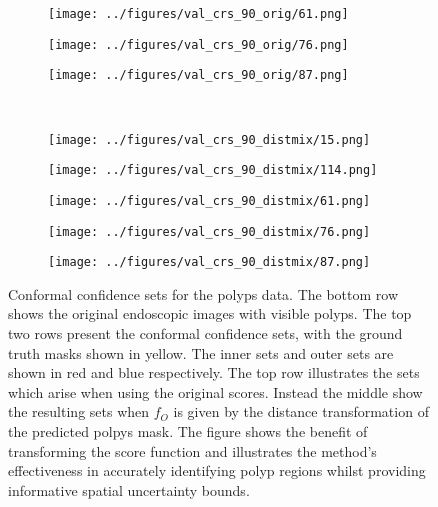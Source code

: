 \begin{figure}
\begin{subfigure}{0.19\textwidth}
		\centering
		\texttt{[image: ../figures/val\_crs\_90\_orig/61.png]}
		\label{fig:1}
	\end{subfigure}
	\begin{subfigure}{0.19\textwidth}
		\centering
		\texttt{[image: ../figures/val\_crs\_90\_orig/76.png]}
		\label{fig:1}
	\end{subfigure}
	\begin{subfigure}{0.19\textwidth}
		\centering
		\texttt{[image: ../figures/val\_crs\_90\_orig/87.png]}
		\label{fig:1}
	\end{subfigure}
	\vspace{-0.4cm}
	\\
	\begin{subfigure}{0.19\textwidth}
		\centering
		\texttt{[image: ../figures/val\_crs\_90\_distmix/15.png]}
		\label{fig:1}
	\end{subfigure}
	\begin{subfigure}{0.19\textwidth}
		\centering
		\texttt{[image: ../figures/val\_crs\_90\_distmix/114.png]}
		\label{fig:1}
	\end{subfigure}
	\begin{subfigure}{0.19\textwidth}
		\centering
		\texttt{[image: ../figures/val\_crs\_90\_distmix/61.png]}
		\label{fig:1}
	\end{subfigure}
	\begin{subfigure}{0.19\textwidth}
		\centering
		\texttt{[image: ../figures/val\_crs\_90\_distmix/76.png]}
		\label{fig:1}
	\end{subfigure}
	\begin{subfigure}{0.19\textwidth}
		\centering
		\texttt{[image: ../figures/val\_crs\_90\_distmix/87.png]}
		\label{fig:1}
	\end{subfigure}
	\label{fig:grid}
	\caption{Conformal confidence sets for the polyps data. The bottom row shows the original endoscopic images with visible polyps. The top two rows present the conformal confidence sets, with the ground truth masks shown in yellow. The inner sets and outer sets are shown in red and blue respectively. The top row illustrates the sets which arise when using the original scores. Instead the middle show the resulting sets when $f_O$ is given by the distance transformation of the predicted polpys mask. The figure shows the benefit of transforming the score function and illustrates the method's effectiveness in accurately identifying polyp regions whilst providing informative spatial uncertainty bounds.}\label{fig:polpys}
\end{figure}


